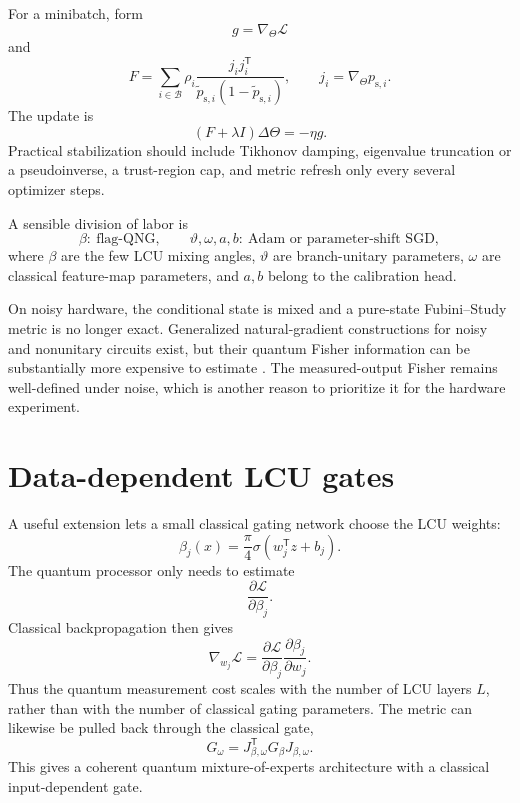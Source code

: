 \documentclass[11pt,a4paper]{article}
\newcommand{\B}{\mathcal{B}}
\newcommand{\T}{\mathsf{T}}
\begin{document}
For a minibatch, form
\begin{equation}
    g=\nabla_\Theta\mathcal L
\end{equation}
and
\begin{equation}
F=\sum_{i\in\B}\rho_i
\frac{j_ij_i^{\T}}
{\widetilde p_{\mathrm{s},i}(1-\widetilde p_{\mathrm{s},i})},
\qquad
j_i=\nabla_\Theta p_{\mathrm{s},i}.
\end{equation}
The update is
\begin{equation}
\boxed{
    (F+\lambda I)\Delta\Theta=-\eta g.
}
\end{equation}
Practical stabilization should include Tikhonov damping, eigenvalue truncation or a pseudoinverse, a trust-region cap, and metric refresh only every several optimizer steps.

A sensible division of labor is
\begin{equation}
\beta:\ \text{flag-QNG},
\qquad
\vartheta,\omega,a,b:\ \text{Adam or parameter-shift SGD},
\end{equation}
where $\beta$ are the few LCU mixing angles, $\vartheta$ are branch-unitary parameters, $\omega$ are classical feature-map parameters, and $a,b$ belong to the calibration head.

On noisy hardware, the conditional state is mixed and a pure-state Fubini--Study metric is no longer exact. Generalized natural-gradient constructions for noisy and nonunitary circuits exist, but their quantum Fisher information can be substantially more expensive to estimate \cite{NoisyQNG2019}. The measured-output Fisher remains well-defined under noise, which is another reason to prioritize it for the hardware experiment.

\section{Data-dependent LCU gates}

A useful extension lets a small classical gating network choose the LCU weights:
\begin{equation}
\beta_j(x)=\frac{\pi}{4}\sigma\!\left(w_j^{\T}z+b_j\right).
\end{equation}
The quantum processor only needs to estimate
\begin{equation}
    \frac{\partial\mathcal L}{\partial\beta_j}.
\end{equation}
Classical backpropagation then gives
\begin{equation}
\nabla_{w_j}\mathcal L
=
\frac{\partial\mathcal L}{\partial\beta_j}
\frac{\partial\beta_j}{\partial w_j}.
\end{equation}
Thus the quantum measurement cost scales with the number of LCU layers $L$, rather than with the number of classical gating parameters. The metric can likewise be pulled back through the classical gate,
\begin{equation}
    G_\omega
    =J_{\beta,\omega}^{\T}G_\beta J_{\beta,\omega}.
\end{equation}
This gives a coherent quantum mixture-of-experts architecture with a classical input-dependent gate.
\end{document}
